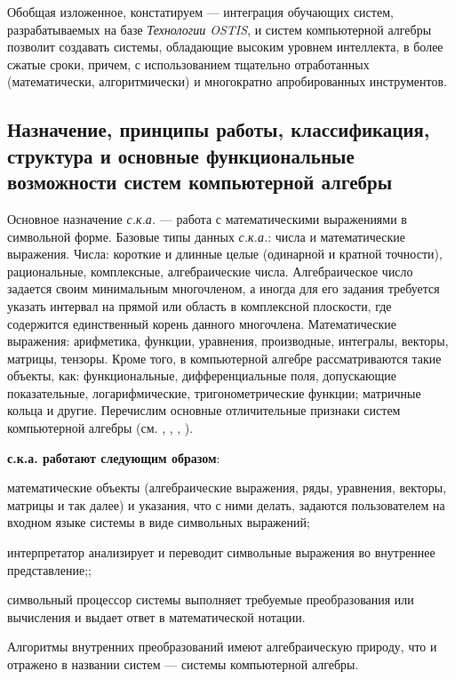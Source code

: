 Обобщая изложенное, констатируем --- интеграция обучающих систем, разрабатываемых на базе \textit{Технологии OSTIS}, и систем компьютерной алгебры позволит создавать системы, обладающие высоким уровнем интеллекта, в более сжатые сроки, причем, с использованием тщательно отработанных (математически, алгоритмически) и многократно апробированных инструментов.

\subsection{Назначение, принципы работы, классификация, структура и основные функциональные возможности систем компьютерной алгебры}
\label{subsec_cas_principles}

Основное назначение \textit{с.к.а.} --- работа с математическими выражениями в символьной форме. Базовые типы данных \textit{с.к.а.}: числа и математические выражения. Числа: короткие и длинные целые (одинарной и кратной точности), рациональные, комплексные, алгебраические числа. Алгебраическое число задается своим минимальным многочленом, а иногда для его задания требуется указать интервал на прямой или область в комплексной плоскости, где содержится единственный корень данного многочлена. Математические выражения: арифметика, функции, уравнения, производные, интегралы, векторы, матрицы, тензоры. Кроме того, в компьютерной алгебре рассматриваются такие объекты, как: функциональные, дифференциальные поля, допускающие показательные, логарифмические, тригонометрические функции; матричные кольца и другие. Перечислим основные отличительные признаки систем компьютерной алгебры (см. , , , ).

\textbf{с.к.а. работают следующим образом}:
\begin{textitemize}
	\item математические объекты (алгебраические выражения, ряды, уравнения, векторы, матрицы и так далее) и указания, что с ними делать, задаются пользователем на входном языке системы в виде символьных выражений;
	\item интерпретатор анализирует и переводит символьные выражения во внутреннее представление;;
	\item символьный процессор системы выполняет требуемые преобразования или вычисления и выдает ответ в математической нотации.
\end{textitemize}
Алгоритмы внутренних преобразований имеют алгебраическую природу, что и отражено в названии систем --- системы компьютерной алгебры.

